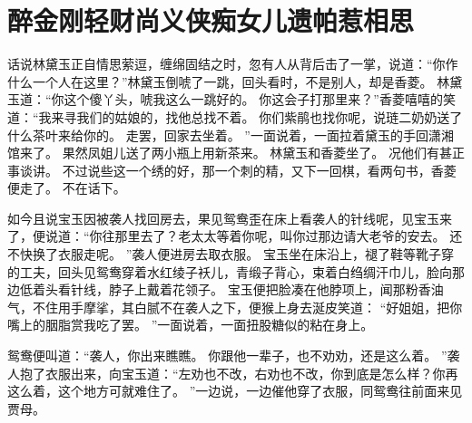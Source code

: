 \chapter{醉金刚轻财尚义侠\quad 痴女儿遗帕惹相思}
\par
话说林黛玉正自情思萦逗，缠绵固结之时，忽有人从背后击了一掌，说道：“你作什么一个人在这里？”林黛玉倒唬了一跳，回头看时，不是别人，却是香菱。
林黛玉道：“你这个傻丫头，唬我这么一跳好的。
你这会子打那里来？”香菱嘻嘻的笑道：“我来寻我们的姑娘的，找他总找不着。
你们紫鹃也找你呢，说琏二奶奶送了什么茶叶来给你的。
走罢，回家去坐着。
”一面说着，一面拉着黛玉的手回潇湘馆来了。
果然凤姐儿送了两小瓶上用新茶来。
林黛玉和香菱坐了。
况他们有甚正事谈讲。
不过说些这一个绣的好，那一个刺的精，又下一回棋，看两句书，香菱便走了。
不在话下。
\par
如今且说宝玉因被袭人找回房去，果见鸳鸯歪在床上看袭人的针线呢，见宝玉来了，便说道：“你往那里去了？老太太等着你呢，叫你过那边请大老爷的安去。
还不快换了衣服走呢。
”袭人便进房去取衣服。
宝玉坐在床沿上，褪了鞋等靴子穿的工夫，回头见鸳鸯穿着水红绫子袄儿，青缎子背心，束着白绉绸汗巾儿，脸向那边低着头看针线，脖子上戴着花领子。
宝玉便把脸凑在他脖项上，闻那粉香油气，不住用手摩挲，其白腻不在袭人之下，便猴上身去涎皮笑道：
“好姐姐，把你嘴上的胭脂赏我吃了罢。
”一面说着，一面扭股糖似的粘在身上。
\par
鸳鸯便叫道：“袭人，你出来瞧瞧。
你跟他一辈子，也不劝劝，还是这么着。
”袭人抱了衣服出来，向宝玉道：“左劝也不改，右劝也不改，你到底是怎么样？你再这么着，这个地方可就难住了。
”一边说，一边催他穿了衣服，同鸳鸯往前面来见贾母。
\par

